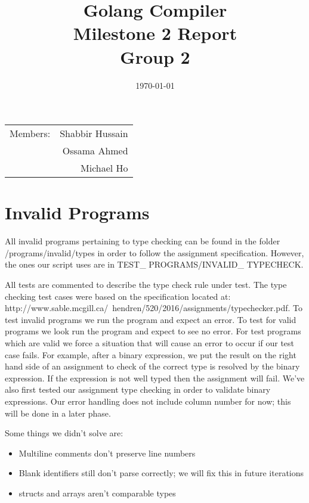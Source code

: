 \documentclass{article}
\title{Golang Compiler\\ Milestone 2 Report\\ Group 2} %
\date{\today} %
\begin{document}
\maketitle %

\begin{center}
\begin{tabular}{l r}
Members: & Shabbir Hussain \\ %
& Ossama Ahmed \\ %
& Michael Ho \\ \end{tabular}
\end{center}

\section{Invalid Programs}
All invalid programs pertaining to type checking can be found in the folder /programs/invalid/types in order to follow the assignment specification. However, the ones our script uses are in TEST\_ PROGRAMS/INVALID\_ TYPECHECK. 

All tests are commented to describe the type check rule under test. The type checking test cases were based on the specification located at: http://www.sable.mcgill.ca/~hendren/520/2016/assignments/typechecker.pdf. To test invalid programs we run the program and expect an error. To test for valid programs we look run the program and expect to see no error. For test programs which are valid we force a situation that will cause an error to occur if our test case fails. For example, after a binary expression, we put the result on the right hand side of an assignment to check of the correct type is resolved by the binary expression. If the expression is not well typed then the assignment will fail. We've also first tested our assignment type checking in order to validate binary expressions. Our error handling does not include column number for now; this will be done in a later phase.
	
Some things we didn't solve are:
\begin{itemize}
\item Multiline comments don't preserve line numbers
\item Blank identifiers still don't parse correctly; we will fix this in future iterations
\item structs and arrays aren't comparable types
\end{itemize}
\end{document}
